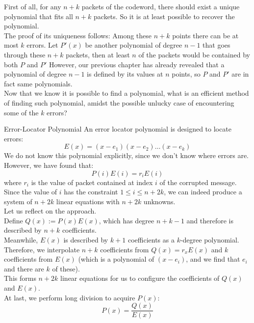 First of all, for any $n + k$ packets of the codeword, there should exist a unique polynomial that fits all $n + k$ packets. So it is at least possible to recover the polynomial. \\
The proof of its uniqueness follows:
Among these $n + k$ points there can be at most $k$ errors. Let $P'(x)$ be another polynomial of degree $n - 1$ that goes through these $n + k$ packets, then at least $n$ of the packets would be contained by both $P$ and $P'$ However, our previous chapter has already revealed that a polynomial of degree $n - 1$ is defined by its values at $n$ points, so $P$ and $P'$ are in fact same polynomials. \\
Now that we know it is possible to find a polynomial, what is an efficient method of finding such polynomial, amidst the possible unlucky case of encountering some of the $k$ errors?
\begin{ln-theorem}{Error-Locator Polynomial}{}
    An error locator polynomial is designed to locate errors:
    \[E(x) = (x - e_1)(x - e_2)\dots(x - e_k)\]
    We do not know this polynomial explicitly, since we don't know where errors are. \\
    However, we have found that:
    \[P(i)E(i) = r_i E(i)\]
    where $r_i$ is the value of packet contained at index $i$ of the corrupted message. \\
    Since the value of $i$ has the constraint $1 \leq i \leq n + 2k$, we can indeed produce a system of $n + 2k$ linear equations with $n + 2k$ unknowns. \\

    Let us reflect on the approach. \\
    Define $Q(x) := P(x)E(x)$, which has degree $n + k - 1$ and therefore is described by $n + k$ coefficients. \\
    Meanwhile, $E(x)$ is described by $k + 1$ coefficients as a $k$-degree polynomial. \\
    Therefore, we interpolate $n + k$ coefficients from $Q(x) = r_x E(x)$ and $k$ coefficients from $E(x)$ (which is a polynomial of $(x - e_i)$, and we find that $e_i$ and there are $k$ of these). \\
    This forms $n + 2k$ linear equations for us to configure the coefficients of $Q(x)$ and $E(x)$. \\
    At last, we perform long division to acquire $P(x)$:
    \[P(x) = \frac{Q(x)}{E(x)}\]
\end{ln-theorem}
